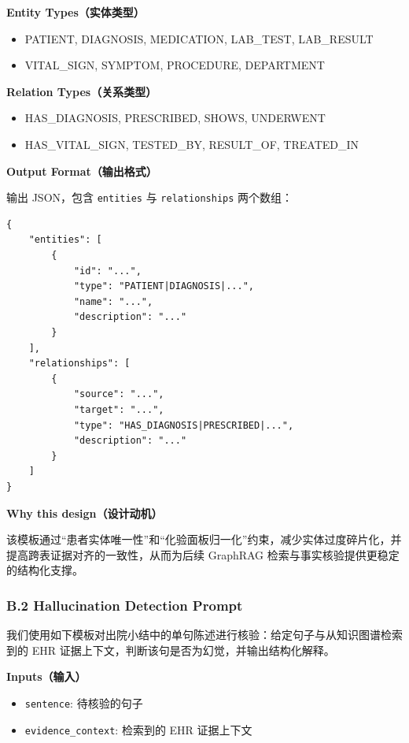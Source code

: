 \documentclass[11pt]{article}
\providecommand{\tightlist}{\setlength{\itemsep}{0pt}\setlength{\parskip}{0pt}}
\begin{document}
\textbf{Entity Types（实体类型）}

\begin{itemize}
\tightlist
\item
  PATIENT, DIAGNOSIS, MEDICATION, LAB\_TEST, LAB\_RESULT
\item
  VITAL\_SIGN, SYMPTOM, PROCEDURE, DEPARTMENT
\end{itemize}

\textbf{Relation Types（关系类型）}

\begin{itemize}
\tightlist
\item
  HAS\_DIAGNOSIS, PRESCRIBED, SHOWS, UNDERWENT
\item
  HAS\_VITAL\_SIGN, TESTED\_BY, RESULT\_OF, TREATED\_IN
\end{itemize}

\textbf{Output Format（输出格式）}

输出 JSON，包含 \texttt{entities} 与 \texttt{relationships} 两个数组：

\begin{verbatim}
{
    "entities": [
        {
            "id": "...",
            "type": "PATIENT|DIAGNOSIS|...",
            "name": "...",
            "description": "..."
        }
    ],
    "relationships": [
        {
            "source": "...",
            "target": "...",
            "type": "HAS_DIAGNOSIS|PRESCRIBED|...",
            "description": "..."
        }
    ]
}
\end{verbatim}

\textbf{Why this design（设计动机）}

该模板通过``患者实体唯一性''和``化验面板归一化''约束，减少实体过度碎片化，并提高跨表证据对齐的一致性，从而为后续 GraphRAG 检索与事实核验提供更稳定的结构化支撑。

\subsubsection{B.2 Hallucination Detection Prompt}

我们使用如下模板对出院小结中的单句陈述进行核验：给定句子与从知识图谱检索到的 EHR 证据上下文，判断该句是否为幻觉，并输出结构化解释。

\textbf{Inputs（输入）}

\begin{itemize}
\tightlist
\item
  \texttt{sentence}: 待核验的句子
\item
  \texttt{evidence\_context}: 检索到的 EHR 证据上下文
\end{itemize}
\end{document}
